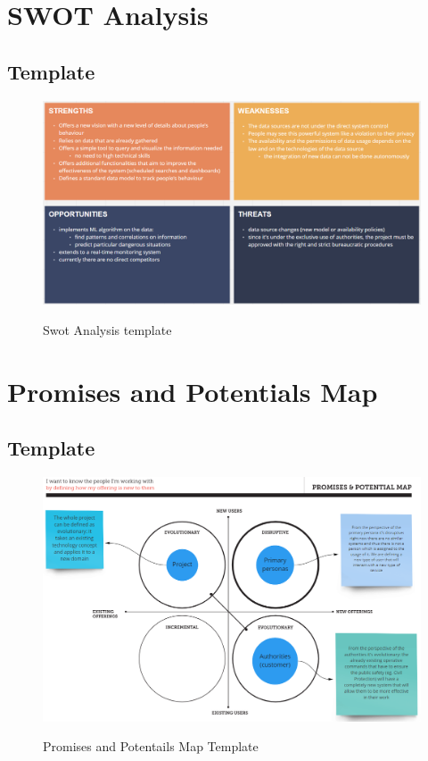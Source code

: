 \documentclass[../main.tex]{subfiles}
\begin{document}
    \chapter{SWOT Analysis}
    \section{Template}
    \begin{figure}[H]
        \centering
        \includegraphics[scale = 0.5]{assets/swot.png} \\
        \caption[]{Swot Analysis template}\label{fig:figure10}
    \end{figure}
    \chapter{Promises and Potentials Map}
    \section{Template}
    \begin{figure}[H]
        \centering
        \includegraphics[scale = 0.6]{assets/promises.png} \\
        \caption[]{Promises and Potentails Map Template}\label{fig:figure11}
    \end{figure}
\end{document}
